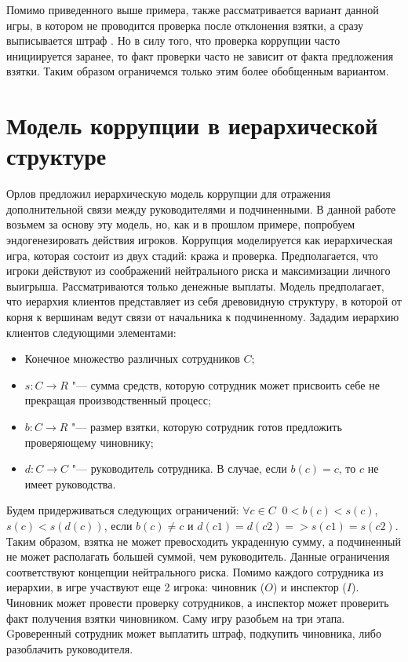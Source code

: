 \par
Помимо приведенного выше примера, также рассматривается вариант данной игры, в котором не проводится проверка после отклонения взятки, а сразу выписывается штраф \cite{Spengler}. Но в силу того, что проверка коррупции часто инициируется заранее, то факт проверки часто не зависит от факта предложения взятки. Таким образом ограничемся только этим более обобщенным вариантом.
\section{Модель коррупции в иерархической структуре}
Орлов\cite{Orlov} предложил иерархическую модель коррупции для отражения дополнительной связи между руководителями и подчиненными. В данной работе возьмем за основу эту модель, но, как и в прошлом примере, попробуем эндогенезировать действия игроков.
Коррупция моделируется как иерархическая игра, которая состоит из двух стадий: кража и проверка. Предполагается, что игроки действуют из соображений нейтрального риска и максимизации личного выигрыша. Рассматриваются только денежные выплаты. Модель предполагает, что иерархия клиентов представляет из себя древовидную структуру, в которой от корня к вершинам ведут связи от начальника к подчиненному.
Зададим иерархию клиентов следующими элементами:
\begin{itemize}
\item Конечное множество различных сотрудников $C$;
\item $s\colon C\to R$ "--- сумма средств, которую сотрудник может присвоить себе не прекращая производственный процесс;
\item $b\colon C\to R$ "--- размер взятки, которую сотрудник готов предложить проверяющему чиновнику;
\item $d\colon C\to C$ "--- руководитель сотрудника. В случае, если  $b(c) = c$, то $c$ не имеет руководства.
 
\end{itemize}
Будем придерживаться следующих ограничений: $\forall c \in C\;\;0 < b(c) < s(c)$, $s(c) < s(d(c))$, если $b(c) \neq c$ и $d(c1)=d(c2) =>s(c1)=s(c2)$. Таким образом, взятка не может превосходить украденную сумму, а подчиненный не может располагать большей суммой, чем руководитель. Данные ограничения соответствуют концепции нейтрального риска\cite{Orlov}.
Помимо каждого сотрудника из иерархии, в игре участвуют еще 2 игрока: чиновник ($O$) и инспектор ($I$). Чиновник может провести проверку сотрудников, а инспектор может проверить факт получения взятки чиновником. Саму игру разобьем на три этапа. Gроверенный сотрудник может выплатить штраф, подкупить чиновника, либо разоблачить руководителя.
